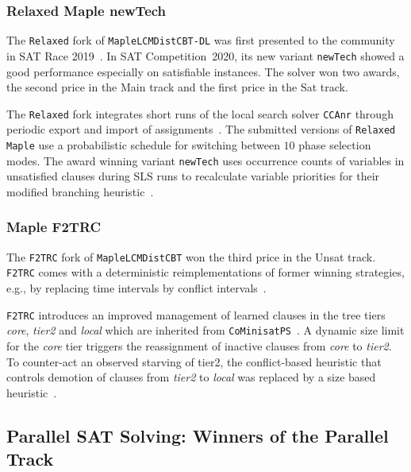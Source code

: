 \documentclass{elsarticle}
\newcommand{\solver}[1]{\texttt{#1}}
\begin{document}
\subsubsection{Relaxed Maple newTech}

The \solver{Relaxed} fork of \solver{MapleLCMDistCBT-DL} was first presented to the community in SAT Race 2019~\cite{Xindi:SC2019}. 
In SAT Competition~2020, its new variant \solver{newTech} showed a good performance especially on satisfiable instances. 
The solver won two awards, the second price in the Main track and the first price in the Sat track.

The \solver{Relaxed} fork integrates short runs of the local search solver \solver{CCAnr} through periodic export and import of assignments~\cite{Xindi:SC2019}. 
The submitted versions of \solver{Relaxed Maple} use a probabilistic schedule for switching between $10$ phase selection modes. 
The award winning variant \solver{newTech} uses occurrence counts of variables in unsatisfied clauses during SLS runs to recalculate variable priorities for their modified branching heuristic~\cite{Xindi:SC2020}. 


\subsubsection{Maple F2TRC}

The \solver{F2TRC} fork of \solver{MapleLCMDistCBT} won the third price in the Unsat track. 
\solver{F2TRC} comes with a deterministic reimplementations of former winning strategies, e.g., by replacing time intervals by conflict intervals~\cite{Kochemazov:SC2020}. 

\solver{F2TRC} introduces an improved management of learned clauses in the tree tiers \emph{core}, \emph{tier2} and \emph{local} which are inherited from \solver{CoMinisatPS}~\cite{Oh:2015:satunsat}.
A dynamic size limit for the \emph{core} tier triggers the reassignment of inactive clauses from \emph{core} to \emph{tier2}. 
To counter-act an observed starving of tier2, the conflict-based heuristic that controls demotion of clauses from \emph{tier2} to \emph{local} was replaced by a size based heuristic~\cite{Kochemazov:SC2020}. 


\subsection{Parallel SAT Solving: Winners of the Parallel Track}
\label{sec:part:par}
\end{document}
